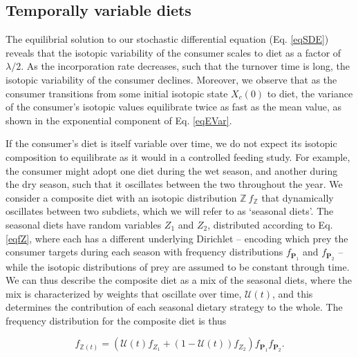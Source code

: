 \documentclass{frontiersSCNS}
\begin{document}
\subsection*{Temporally variable diets}
The equilibrial solution to our stochastic differential equation (Eq. \ref{eqSDE}) reveals that the isotopic variability of the consumer scales to diet as a factor of $\lambda/2$.
As the incorporation rate decreases, such that the turnover time is long, the isotopic variability of the consumer declines.
Moreover, we observe that as the consumer transitions from some initial isotopic state $X_c(0)$ to diet, the variance of the consumer's isotopic values equilibrate twice as fast as the mean value, as shown in the exponential component of Eq. \ref{eqEVar}.

If the consumer's diet is itself variable over time, we do not expect its isotopic composition to equilibrate as it would in a controlled feeding study.
For example, the consumer might adopt one diet during the wet season, and another during the dry season, such that it oscillates between the two throughout the year.
We consider a composite diet with an isotopic distribution $\mathbb Z ~ f_{\mathbb Z}$ that dynamically oscillates between two subdiets, which we will refer to as `seasonal diets'.
The seasonal diets have random variables $Z_1$ and $Z_2$, distributed according to Eq. \ref{eqfZ}, where each has a different underlying Dirichlet -- encoding which prey the consumer targets during each season with frequency distributions $f_{\bm P_1}$ and $f_{\bm P_2}$ -- while the isotopic distributions of prey are assumed to be constant through time.
We can thus describe the composite diet as a mix of the seasonal diets, where the mix is characterized by weights that oscillate over time, $\mathcal{U}(t)$, and this determines the contribution of each seasonal dietary strategy to the whole.
The frequency distribution for the composite diet is thus


\begin{equation}
  f_{\mathbb{Z}(t)} = \left(\mathcal{U}(t) f_{Z_1} + (1-\mathcal{U}(t)) f_{Z_2}\right)f_{\bm P_1}f_{\bm P_2}.
\end{equation}
\end{document}
